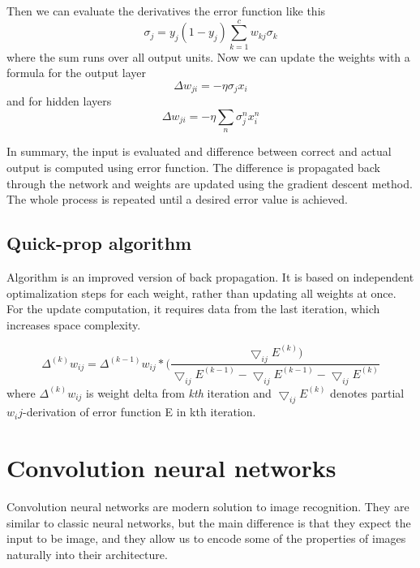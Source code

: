 Then we can evaluate the derivatives the error function like this
\begin{equation*}
\sigma_{j} = y_{j}(1-y_{j}) \sum_{k=1}^{c} w_{kj} \sigma_{k}
\end{equation*}
where the sum runs over all output units. Now we can update the weights with a formula for the output layer
\begin{equation*}
\Delta w_{ji} = - \eta \sigma_{j} x_{i}
\end{equation*}
and for hidden layers
\begin{equation*}
\Delta w_{ji} =  - \eta \sum_{n} \sigma_{j}^{n} x_{i}^{n}
\end{equation*}

In summary, the input is evaluated and difference between correct and actual output is computed using error function. The difference is propagated back through the network and weights are updated using the gradient descent method. The whole process is repeated until a desired error value is achieved.

\subsection{Quick-prop algorithm}
Algorithm is an improved version of back propagation. It is based on independent optimalization steps for each weight, rather than updating all weights at once. For the update computation, it requires data from the last iteration, which increases space complexity. 

\begin{equation*}
\Delta ^{(k)} w_{ij} = \Delta^{(k-1)} w_{ij}*(\frac {\bigtriangledown_{ij} E^{(k)})} {\bigtriangledown_{ij} E^{(k-1)} - \bigtriangledown_{ij} E^(k-1) - \bigtriangledown_{ij} E^{(k)} }
\end{equation*}
where $\Delta ^{(k)} w_{ij}$ is weight delta from \emph{kth} iteration and $\bigtriangledown_{ij} E^(k)$ denotes partial $w_ij$-derivation of error function E in kth iteration.

\section{Convolution neural networks}
Convolution neural networks are modern solution to image recognition. They are similar to classic neural networks, but the main difference is that they expect the input to be image, and they allow us to encode some of the properties of images naturally into their architecture.

